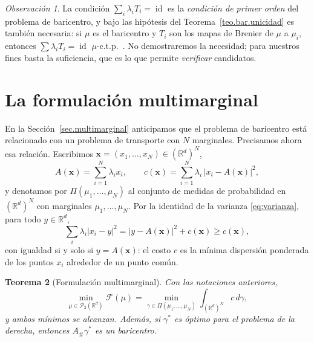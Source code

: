 \documentclass[12pt, a4paper]{amsbook}
\newcommand{\id}{\operatorname{id}}
\newcommand{\R}{{\mathbb R}}
\newtheorem{teo}{Teorema}[section]
\theoremstyle{remark}
\newtheorem{obs}[teo]{Observación}
\theoremstyle{definition}
\numberwithin{section}{chapter}
\numberwithin{subsection}{section}
\numberwithin{equation}{section}
\numberwithin{figure}{chapter}
\begin{document}
\begin{obs}
La condición $\sum_i\lambda_iT_i=\id$ es la \emph{condición de primer orden}
del problema de baricentro, y bajo las hipótesis del
Teorema~\ref{teo.bar.unicidad} es también necesaria: si $\mu$ es el baricentro
y $T_i$ son los mapas de Brenier de $\mu$ a $\mu_i$, entonces
$\sum\lambda_iT_i=\id$ $\mu$-c.t.p.\ \cite[Proposition~3.8]{AguehCarlier2011}.
No demostraremos la necesidad; para nuestros fines basta la suficiencia, que
es lo que permite \emph{verificar} candidatos.
\end{obs}

\section{La formulación multimarginal}\label{sec.bar.multimarginal}

En la Sección~\ref{sec.multimarginal} anticipamos que el problema de
baricentro está relacionado con un problema de transporte con $N$ marginales. Precisamos ahora
esa relación. Escribimos $\mathbf x=(x_1,\dots,x_N)\in(\R^d)^N$,
\[
A(\mathbf x)=\sum_{i=1}^N\lambda_ix_i,
\qquad
c(\mathbf x)=\sum_{i=1}^N\lambda_i\,|x_i-A(\mathbf x)|^2,
\]
y denotamos por $\Pi(\mu_1,\dots,\mu_N)$ al conjunto de medidas de probabilidad
en $(\R^d)^N$ con marginales $\mu_1,\dots,\mu_N$. Por la identidad de la
varianza \eqref{eq:varianza}, para todo $y\in\R^d$,
\begin{equation}\label{eq:varianza.N}
\sum_i\lambda_i|x_i-y|^2=|y-A(\mathbf x)|^2+c(\mathbf x)\ge c(\mathbf x),
\end{equation}
con igualdad si y solo si $y=A(\mathbf x)$: el costo $c$ es la mínima
dispersión ponderada de los puntos $x_i$ alrededor de un punto común.

\begin{teo}[Formulación multimarginal]\label{teo.bar.multimarginal}
Con las notaciones anteriores,
\[
\min_{\mu\in\mathcal P_2(\R^d)}\mathcal F(\mu)
=\min_{\gamma\in\Pi(\mu_1,\dots,\mu_N)}\int_{(\R^d)^N}c\,d\gamma,
\]
y ambos mínimos se alcanzan. Además, si $\gamma^*$ es óptimo para el problema
de la derecha, entonces $A_\#\gamma^*$ es un baricentro.
\end{teo}
\end{document}
